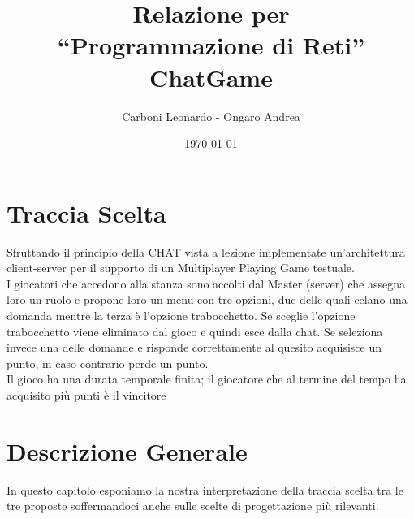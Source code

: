 \documentclass[a4paper,12pt]{report}
\title{Relazione per \\``Programmazione di Reti'' \\ ChatGame}
\author{Carboni Leonardo - Ongaro Andrea}
\date{\today}
\begin{document}
\maketitle

\tableofcontents
\thispagestyle{fancy}

\chapter{Traccia Scelta}
Sfruttando il principio della CHAT vista a lezione implementate
un’architettura client-server per il supporto di un Multiplayer
Playing Game testuale. \\
I giocatori che accedono alla stanza sono accolti dal Master
(server) che assegna loro un ruolo e propone loro un menu con
tre opzioni, due delle quali celano una domanda mentre la
terza è l’opzione trabocchetto. Se sceglie l’opzione trabocchetto viene eliminato dal gioco e quindi esce dalla chat.
Se seleziona invece una delle domande e risponde
correttamente al quesito acquisisce un punto, in caso contrario
perde un punto.\\
Il gioco ha una durata temporale finita; il giocatore che al
termine del tempo ha acquisito più punti è il vincitore

\chapter{Descrizione Generale}
In questo capitolo esponiamo la nostra interpretazione della traccia scelta tra le tre proposte soffermandoci anche sulle scelte di progettazione più rilevanti.
\end{document}
